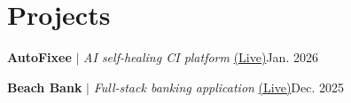 \section{Projects}
  \resumeSubHeadingListStart

    \resumeProjectHeading
      {\textbf{AutoFixee} $|$ \emph{AI self-healing CI platform} \href{https://auto-fix-dashboard.vercel.app/}{(Live)}}{Jan. 2026}
      \resumeItemListStart
      \resumeItemListEnd

    \resumeProjectHeading
      {\textbf{Beach Bank} $|$ \emph{Full-stack banking application} \href{https://beachbank.netlify.app}{(Live)}}{Dec. 2025}
      \resumeItemListStart
      \resumeItemListEnd

  \resumeSubHeadingListEnd